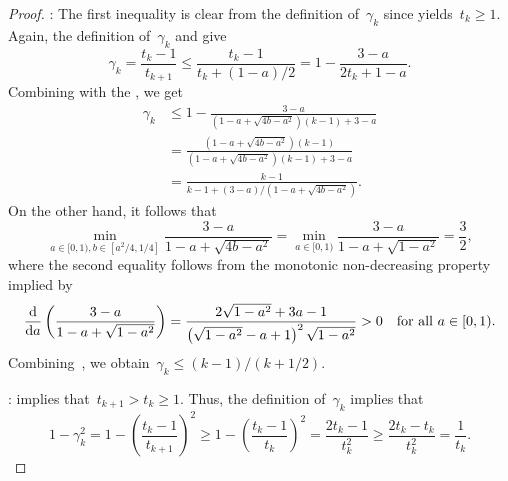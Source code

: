 \documentclass[../main]{subfiles}
\begin{document}
\begin{proof}
    :
    The first inequality is clear from the definition of~$\gamma_k$ since  yields~$t_k \ge 1$.
    Again, the definition of~$\gamma_k$ and  give
    \begin{equation}
        \gamma_k = \frac{t_k - 1}{t_{k + 1}} \le \frac{t_k - 1}{t_k + (1 - a) / 2} = 1 - \frac{3 - a}{2 t_k + 1 - a}
        .\end{equation}
    Combining with the , we get
    \begin{equation} \label{eq:gamma}
        \begin{split}
            \gamma_k &\le 1 - \frac{3 - a}{\left(1 - a + \sqrt{4 b - a^2} \right)(k - 1) + 3 - a} \\
            &= \frac{\left( 1 - a + \sqrt{4 b - a^2} \right) (k - 1)}{\left(1 - a + \sqrt{4 b - a^2} \right)(k - 1) + 3 - a} \\
            &= \frac{k - 1}{k - 1 + (3 - a) / \left( 1 - a + \sqrt{4 b - a^2} \right)}
            .\end{split}
    \end{equation}
    On the other hand, it follows that
    \begin{equation} \label{eq:min a b}
        \min_{a \in [0, 1), b \in [a^2 / 4, 1 / 4]} \frac{3 - a}{1 - a + \sqrt{4 b - a^2}} = \min_{a \in [0, 1)} \frac{3 - a}{1 - a + \sqrt{1 - a^2}} = \frac{3}{2}
        ,\end{equation}
    where the second equality follows from the monotonic non-decreasing property implied by
    \begin{equation}
        \odv*{\left(\frac{3 - a}{1 - a + \sqrt{1 - a^2}}\right)}{a} = \frac{2 \sqrt{1 - a^2} + 3a - 1}{\left( \sqrt{1 - a^2} - a + 1 \right)^2 \sqrt{1 - a^2}} > 0 \forallcondition{a \in [0, 1)}
        .\end{equation}
    Combining~, we obtain~$\gamma_k \le (k - 1) / (k + 1 / 2)$.

    :
     implies that~$t_{k + 1} > t_k \ge 1$.
    Thus, the definition of~$\gamma_k$ implies that
    \begin{equation}
        1 - \gamma_k^2 = 1 - \left( \frac{t_k - 1}{t_{k + 1}} \right)^2 \ge 1 - \left( \frac{t_k - 1}{t_k} \right)^2
        = \frac{2 t_k - 1}{t_k^2} \ge \frac{2 t_k - t_k}{t_k^2} = \frac{1}{t_k}
        .\end{equation}
\end{proof}
\end{document}
